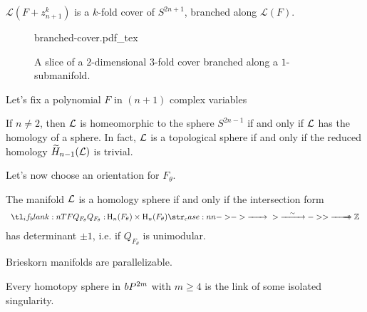 \begin{proposition}
	$\mathcal{L}(F+z_{n+1}^k)$ is a $k$-fold cover of $S^{2n+1}$, branched along $\mathcal{L}(F)$.
\end{proposition}

\begin{figure}[ht]
	\centering
	{branched-cover.pdf_tex}
	\caption{A slice of a $2$-dimensional $3$-fold cover branched along a $1$-submanifold.}
\end{figure}

Let's fix a polynomial $F$ in $(n+1)$ complex variables

\begin{proposition}
	If $n\neq 2$, then $\mathcal{L}$ is homeomorphic to the sphere $S^{2n-1}$ if and only if $\mathcal{L}$ has the homology of a sphere. In fact, $\mathcal{L}$ is a topological sphere if and only if the reduced homology $\widetilde{H}_{n-1}(\mathcal{L})$ is trivial.
\end{proposition}

Let's now choose an orientation for $F_\theta$.

\begin{proposition}
	The manifold $\mathcal{L}$ is a homology sphere if and only if the intersection form
	\[
		\lkxfunc{Q_{F_\theta}}{\H_n(F_\theta)\times \H_n(F_\theta)}{\Z}
	\]
	has determinant $\pm 1$, i.e. if $Q_{F_\theta}$ is unimodular.
\end{proposition}

\begin{theorem} 
	Brieskorn manifolds are parallelizable.
\end{theorem}

\begin{theorem}[Brieskorn]
	Every homotopy sphere in $bP^{2m}$ with $m\geq 4$ is the link of some isolated singularity.
\end{theorem}

